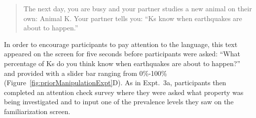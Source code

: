 \documentclass[floatsintext,doc]{apa6}
\begin{document}
\begin{quote}
The next day, you are busy and your partner studies a new animal on their own: Animal K.
Your partner tells you: \enquote{Ks know when earthquakes are about to happen.}
\end{quote}

In order to encourage participants to pay attention to the language, this text appeared on the screen for five seconds before participants were asked: \enquote{What percentage of Ks do you think know when earthquakes are about to happen?} and provided with a slider bar ranging from 0\%-100\% (Figure~\ref{fig:priorManipulationExpt}D).
As in Expt.~3a, participants then completed an attention check survey where they were asked what property was being investigated and to input one of the prevalence levels they saw on the familiarization screen.

\end{document}
